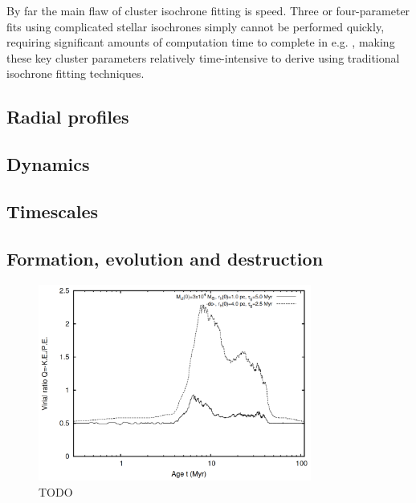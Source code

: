 By far the main flaw of cluster isochrone fitting is speed. Three or four-parameter fits using complicated stellar isochrones simply cannot be performed quickly, requiring significant amounts of computation time to complete in e.g. \cite{yen_reanalysis_2018}, making these key cluster parameters relatively time-intensive to derive using traditional isochrone fitting techniques.


\subsection{Radial profiles}
\label{sec:intro:theory:profile}


\subsection{Dynamics}
\label{sec:intro:theory:dynamics}


\subsection{Timescales}
\label{sec:intro:theory:timescales}


\subsection{Formation, evolution and destruction}
\label{sec:intro:theory:evolution}

\begin{figure}[tb]
	\centering
	\includegraphics[width=0.8\textwidth]{fig/c1/virialisation_placid_gas_expulsion.png}
	\caption[TODO]{TODO}
	\label{fig:intro:theory:feedback}
\end{figure}


